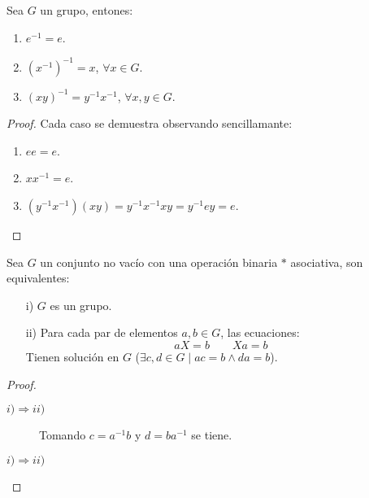\begin{prop}
    Sea $G$ un grupo, entones:
    \begin{enumerate}
        \item $e^{-1} = e$.
        \item ${(x^{-1})}^{-1} = x$, $\forall x\in G$.
        \item ${(xy)}^{-1} = y^{-1}x^{-1}$, $\forall x,y\in G$.
    \end{enumerate}
    \begin{proof} Cada caso se demuestra observando sencillamante:
        \begin{enumerate}
            \item $e e = e$.
            \item $xx^{-1} = e$.
            \item $(y^{-1}x^{-1})(xy) = y^{-1}x^{-1}xy = y^{-1} e y = e$.
        \end{enumerate}
    \end{proof}
\end{prop}

\begin{prop}
    Sea $G$ un conjunto no vacío con una operación binaria $\ast$ asociativa, son equivalentes:
    \begin{enumerate}
        \item[i)] $G$ es un grupo.
        \item[ii)] Para cada par de elementos $a,b\in G$, las ecuaciones:
            \begin{equation*}
                aX = b \qquad Xa = b
            \end{equation*}
            Tienen solución en $G$ ($\exists c,d\in G\mid ac=b \land da = b$).
    \end{enumerate}
    \begin{proof}
        \begin{description}
            \item [$i)\Rightarrow ii)$] Tomando $c=a^{-1}b$ y $d = ba^{-1}$ se tiene.
            \item [$i)\Rightarrow ii)$] %
        \end{description}
    \end{proof}
\end{prop}
